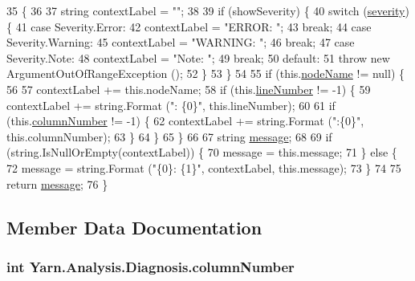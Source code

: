 \begin{DoxyCode}
35         \{
36 
37             \textcolor{keywordtype}{string} contextLabel = \textcolor{stringliteral}{""};
38 
39             \textcolor{keywordflow}{if} (showSeverity) \{
40                 \textcolor{keywordflow}{switch} (\hyperlink{a00085_ad90ffa839ce0f568a099bb37b4a6c4da}{severity}) \{
41                 \textcolor{keywordflow}{case} Severity.Error:
42                     contextLabel = \textcolor{stringliteral}{"ERROR: "};
43                     \textcolor{keywordflow}{break};
44                 \textcolor{keywordflow}{case} Severity.Warning:
45                     contextLabel = \textcolor{stringliteral}{"WARNING: "};
46                     \textcolor{keywordflow}{break};
47                 \textcolor{keywordflow}{case} Severity.Note:
48                     contextLabel = \textcolor{stringliteral}{"Note: "};
49                     \textcolor{keywordflow}{break};
50                 \textcolor{keywordflow}{default}:
51                     \textcolor{keywordflow}{throw} \textcolor{keyword}{new} ArgumentOutOfRangeException ();
52                 \}
53             \}
54 
55             \textcolor{keywordflow}{if} (this.\hyperlink{a00085_a662aca4ad2af5116c2cf6773daf1a847}{nodeName} != null) \{
56 
57                 contextLabel += this.nodeName;
58                 \textcolor{keywordflow}{if} (this.\hyperlink{a00085_a0bd73f1c684bfd66ae7b6bef8f2972d0}{lineNumber} != -1) \{
59                     contextLabel += string.Format (\textcolor{stringliteral}{": \{0\}"}, this.lineNumber);
60 
61                     \textcolor{keywordflow}{if} (this.\hyperlink{a00085_a658e7fb05555c0f9ab5f80057bdc1408}{columnNumber} != -1) \{
62                         contextLabel += string.Format (\textcolor{stringliteral}{":\{0\}"}, this.columnNumber);
63                     \}
64                 \}
65             \}
66 
67             \textcolor{keywordtype}{string} \hyperlink{a00085_ac7ed070dddd2613c08e7874ea5afb3af}{message};
68 
69             \textcolor{keywordflow}{if} (\textcolor{keywordtype}{string}.IsNullOrEmpty(contextLabel)) \{
70                 message = this.message;
71             \} \textcolor{keywordflow}{else} \{
72                 message = string.Format (\textcolor{stringliteral}{"\{0\}: \{1\}"}, contextLabel, this.message);
73             \}
74 
75             \textcolor{keywordflow}{return} \hyperlink{a00085_ac7ed070dddd2613c08e7874ea5afb3af}{message};
76         \}
\end{DoxyCode}


\subsection{Member Data Documentation}
\hypertarget{a00085_a658e7fb05555c0f9ab5f80057bdc1408}{
\subsubsection[{column\-Number}]{\setlength{\rightskip}{0pt plus 5cm}int Yarn.\-Analysis.\-Diagnosis.\-column\-Number}}\label{a00085_a658e7fb05555c0f9ab5f80057bdc1408}


